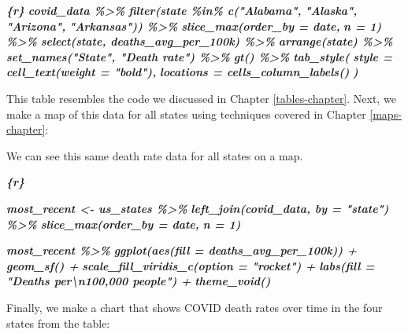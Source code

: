 \documentclass[
]{book}
\newenvironment{Shaded}{\begin{snugshade}}{\end{snugshade}}
\newcommand{\InformationTok}[1]{\textcolor[rgb]{0.56,0.35,0.01}{\textbf{\textit{#1}}}}
\newcommand{\NormalTok}[1]{#1}
\begin{document}
\begin{Shaded}
\begin{Highlighting}[]
\InformationTok{\textasciigrave{}\textasciigrave{}\textasciigrave{}\{r\}}
\InformationTok{covid\_data \%\textgreater{}\% }
\InformationTok{  filter(state \%in\% c("Alabama",}
\InformationTok{                      "Alaska",}
\InformationTok{                      "Arizona",}
\InformationTok{                      "Arkansas")) \%\textgreater{}\% }
\InformationTok{  slice\_max(order\_by = date,}
\InformationTok{            n = 1) \%\textgreater{}\% }
\InformationTok{  select(state, deaths\_avg\_per\_100k) \%\textgreater{}\% }
\InformationTok{  arrange(state) \%\textgreater{}\% }
\InformationTok{  set\_names("State", "Death rate") \%\textgreater{}\% }
\InformationTok{  gt() \%\textgreater{}\% }
\InformationTok{  tab\_style(}
\InformationTok{    style = cell\_text(weight = "bold"),}
\InformationTok{    locations = cells\_column\_labels()}
\InformationTok{  )}
\InformationTok{\textasciigrave{}\textasciigrave{}\textasciigrave{}}
\end{Highlighting}
\end{Shaded}

This table resembles the code we discussed in Chapter \ref{tables-chapter}. Next, we make a map of this data for all states using techniques covered in Chapter \ref{maps-chapter}:

\begin{Shaded}
\begin{Highlighting}[]
\NormalTok{We can see this same death rate data for all states on a map.}

\InformationTok{\textasciigrave{}\textasciigrave{}\textasciigrave{}\{r\}}

\InformationTok{most\_recent \textless{}{-} us\_states \%\textgreater{}\% }
\InformationTok{  left\_join(covid\_data, by = "state") \%\textgreater{}\% }
\InformationTok{  slice\_max(order\_by = date,}
\InformationTok{            n = 1) }

\InformationTok{most\_recent \%\textgreater{}\% }
\InformationTok{  ggplot(aes(fill = deaths\_avg\_per\_100k)) +}
\InformationTok{  geom\_sf() +}
\InformationTok{  scale\_fill\_viridis\_c(option = "rocket") +}
\InformationTok{  labs(fill = "Deaths per\textbackslash{}n100,000 people") +}
\InformationTok{  theme\_void()}
\InformationTok{\textasciigrave{}\textasciigrave{}\textasciigrave{}}
\end{Highlighting}
\end{Shaded}

Finally, we make a chart that shows COVID death rates over time in the four states from the table:
\end{document}

